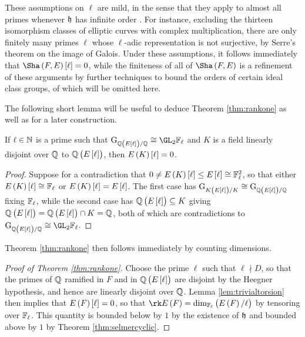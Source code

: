 These assumptions on $ \ell $ are mild, in the sense that they apply to almost all primes whenever $ \mathfrak{h} $ has infinite order \cite[Section 2]{Gro91}. For instance, excluding the thirteen isomorphism classes of elliptic curves with complex multiplication, there are only finitely many primes $ \ell $ whose $ \ell $-adic representation is not surjective, by Serre's theorem on the image of Galois. Under these assumptions, it follows immediately that $ \Sha\br{F, E}\sbr{\ell} = 0 $, while the finiteness of all of $ \Sha\br{F, E} $ is a refinement of these arguments by further techniques to bound the orders of certain ideal class groups, of which will be omitted here.

The following short lemma will be useful to deduce Theorem \ref{thm:rankone} as well as for a later construction.

\begin{lemma}
\label{lem:trivialtorsion}
If $ \ell \in \mathbb{N} $ is a prime such that $ \G_{\QQ\br{E\sbr{\ell}} / \QQ} \cong \GL_2 \FF_\ell $ and $ K $ is a field linearly disjoint over $ \mathbb{Q} $ to $ \QQ\br{E\sbr{\ell}} $, then $ E\br{K}\sbr{\ell} = 0 $.
\end{lemma}

\begin{proof}
Suppose for a contradiction that $ 0 \ne E\br{K}\sbr{\ell} \le E\sbr{\ell} \cong \FF_\ell^2 $, so that either $ E\br{K}\sbr{\ell} \cong \FF_\ell $ or $ E\br{K}\sbr{\ell} = E\sbr{\ell} $. The first case has $ \G_{K\br{E\sbr{\ell}} / K} \cong \G_{\QQ\br{E\sbr{\ell}} / \QQ} $ fixing $ \mathbb{F}_\ell $, while the second case has $ \QQ\br{E\sbr{\ell}} \subseteq K $ giving $ \QQ\br{E\sbr{\ell}} = \QQ\br{E\sbr{\ell}} \cap K = \QQ $, both of which are contradictions to $ \G_{\QQ\br{E\sbr{\ell}} / \QQ} \cong \GL_2 \FF_\ell $.
\end{proof}

Theorem \ref{thm:rankone} then follows immediately by counting dimensions.

\begin{proof}[Proof of Theorem \ref{thm:rankone}]
Choose the prime $ \ell $ such that $ \ell \nmid D $, so that the primes of $ \mathbb{Q} $ ramified in $ F $ and in $ \QQ\br{E\sbr{\ell}} $ are disjoint by the Heegner hypothesis, and hence are linearly disjoint over $ \mathbb{Q} $. Lemma \ref{lem:trivialtorsion} then implies that $ E\br{F}\sbr{\ell} = 0 $, so that $ \rk E\br{F} = \dim_{\FF_\ell} \br{E\br{F} / \ell} $ by tensoring over $ \mathbb{F}_\ell $. This quantity is bounded below by $ 1 $ by the existence of $ \mathfrak{h} $ and bounded above by $ 1 $ by Theorem \ref{thm:selmercyclic}.
\end{proof}

